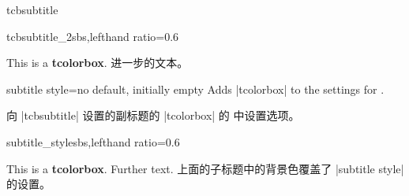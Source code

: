 \begin{docCommand}[doc new=2014-10-10]{tcbsubtitle}{}









\begin{exdispExample*}{tcbsubtitle_2}{sbs,lefthand ratio=0.6}
\begin{tcolorbox}[title=My title,
    colback=red!5!white,
    colframe=red!75!black,
    colbacktitle=yellow!50!red,
    coltitle=red!25!black,
    fonttitle=\bfseries]
  This is a \textbf{tcolorbox}.
进一步的文本。
\end{tcolorbox}
\end{exdispExample*}
\end{docCommand}

\begin{docTcbKey}[][doc new=2014-10-10]{subtitle style}{=}{no default, initially empty}
Adds |tcolorbox|  to the settings for .

向 |tcbsubtitle| 设置的副标题的 |tcolorbox| 的  中设置选项。

\begin{exdispExample*}{subtitle_style}{sbs,lefthand ratio=0.6}
\begin{tcolorbox}[title=My title,
  colback=red!5!white,
  colframe=red!75!black,
  colbacktitle=yellow!50!red,
  coltitle=red!25!black,
  fonttitle=\bfseries,
  subtitle style={boxrule=0.4pt,
    colback=yellow!50!red!25!white} ]
  This is a \textbf{tcolorbox}.
  Further text.
上面的子标题中的背景色覆盖了 |subtitle style| 的设置。
\end{tcolorbox}
\end{exdispExample*}
\end{docTcbKey}
